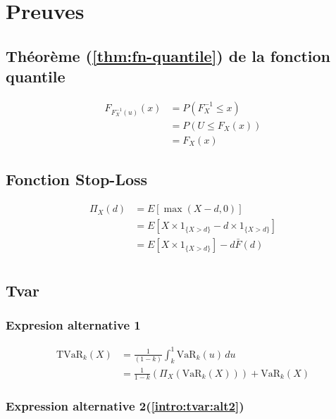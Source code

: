\chapter{Preuves}\label{preuves}

\section{Théorème (\ref{thm:fn-quantile}) de la fonction quantile}\label{theoreme-refthmfn-quantile-de-la-fonction-quantile}

\label{preuves:fn-quantile} 

\begin{align*}
F_{F_X^{-1}(u)}(x)& =P(F_X^{-1} \le x)\\
& =P(U \le F_X(x))\\
& =F_X(x)
\end{align*}




\section{Fonction Stop-Loss}\label{fonction-stop-lossrefintrofn-stop}

\begin{align*}
\label{preuves:fn-stop} 
\Pi_X(d)& = E[\max(X-d, 0)]\\
& =E\left[X \times \mathrm{1}_{ \{X > d\} } -d\times \mathrm{1}_{\{X > d\}}\right]\\
& =E\left[X \times \mathrm{1}_{\{X > d\}}\right]-d \bar{F}(d)\\
\end{align*}


\section{Tvar}\label{tvar-1}

\subsection*{Expresion alternative 1}\label{expresion-alternative-1refintrotvaralt1}


\begin{align*}
\text{TVaR}_k(X)& =\frac{1}{(1-k)}\int_k^1\text{VaR}_k(u)\,du\\
& =\frac{1}{1-k}\left(\Pi_X(\text{VaR}_k(X))\right)+\text{VaR}_k(X)
\end{align*}
\label{preuves:tvar:1}


\subsection*{Expression alternative 2(\ref{intro:tvar:alt2})}\label{expression-alternative-2refintrotvaralt2}

